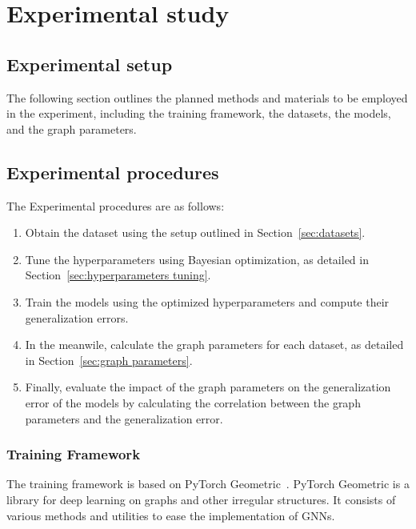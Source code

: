 \chapter{Experimental study}\label{chap:experiments}
\section{Experimental setup}
The following section outlines the planned methods and materials to be employed in the experiment, including the training framework, the datasets, the models, and the graph parameters.

\section{Experimental procedures}\label{sec:Experimental procedures}
The Experimental procedures are as follows:

\begin{enumerate}
    \item Obtain the dataset using the setup outlined in Section~\ref{sec:datasets}.
    \item Tune the hyperparameters using Bayesian optimization, as detailed in Section~\ref{sec:hyperparameters tuning}.
    \item Train the models using the optimized hyperparameters and compute their generalization errors.
    \item In the meanwile, calculate the graph parameters for each dataset, as detailed in Section~\ref{sec:graph parameters}.
    \item Finally, evaluate the impact of the graph parameters on the generalization error of the models by calculating the correlation between the graph parameters and the generalization error.
\end{enumerate}


\subsection{Training Framework}
The training framework is based on PyTorch Geometric~\cite{fey2019fast}. PyTorch Geometric is a library for deep learning on graphs and other irregular structures. It consists of various methods and utilities to ease the implementation of GNNs. 

